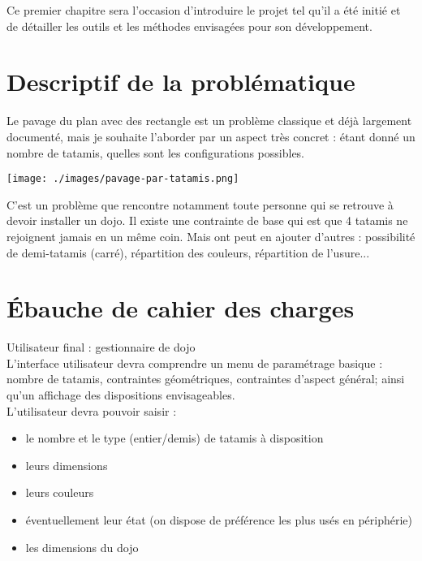 \begin{summary}
    Ce premier chapitre sera l'occasion d'introduire le projet tel qu'il a été initié et de 
    détailler les outils et les méthodes envisagées pour son développement.
  \end{summary}

\section{Descriptif de la problématique}


Le pavage du plan avec des rectangle est un problème classique et déjà largement documenté,
mais je souhaite l'aborder par un aspect très concret : étant donné un nombre de tatamis, quelles sont les
configurations possibles.\\
\begin{center}
    \texttt{[image: ./images/pavage-par-tatamis.png]}
\end{center}
C'est un problème que rencontre notamment toute personne qui se retrouve à devoir installer un dojo.
Il existe une contrainte de base qui est que 4 tatamis ne rejoignent jamais en un même coin. Mais ont peut
en ajouter d'autres : possibilité de demi-tatamis (carré), répartition des couleurs, répartition de l'usure...

\section{Ébauche de cahier des charges}

Utilisateur final : gestionnaire de dojo\\

L'interface utilisateur devra comprendre un menu de paramétrage basique : nombre de tatamis,
contraintes géométriques, contraintes d'aspect général; ainsi qu'un affichage des dispositions envisageables.\\

L'utilisateur devra pouvoir saisir :

\begin{itemize}
    \item le nombre et le type (entier/demis) de tatamis à disposition
    \item leurs dimensions
    \item leurs couleurs
    \item éventuellement leur état (on dispose de préférence les plus usés en périphérie)
    \item les dimensions du dojo
\end{itemize}

